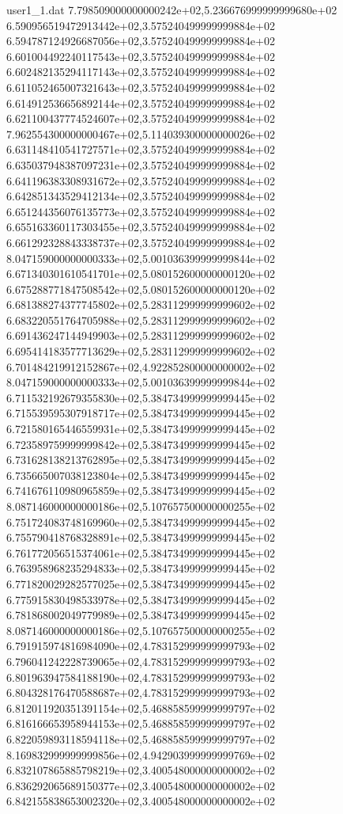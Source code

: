 \begin{filecontents}{user1_1.dat}
7.798509000000000242e+02,5.236676999999999680e+02
6.590956519472913442e+02,3.575240499999999884e+02
6.594787124926687056e+02,3.575240499999999884e+02
6.601004492240117543e+02,3.575240499999999884e+02
6.602482135294117143e+02,3.575240499999999884e+02
6.611052465007321643e+02,3.575240499999999884e+02
6.614912536656892144e+02,3.575240499999999884e+02
6.621100437774524607e+02,3.575240499999999884e+02
7.962554300000000467e+02,5.114039300000000026e+02
6.631148410541727571e+02,3.575240499999999884e+02
6.635037948387097231e+02,3.575240499999999884e+02
6.641196383308931672e+02,3.575240499999999884e+02
6.642851343529412134e+02,3.575240499999999884e+02
6.651244356076135773e+02,3.575240499999999884e+02
6.655163360117303455e+02,3.575240499999999884e+02
6.661292328843338737e+02,3.575240499999999884e+02
8.047159000000000333e+02,5.001036399999999844e+02
6.671340301610541701e+02,5.080152600000000120e+02
6.675288771847508542e+02,5.080152600000000120e+02
6.681388274377745802e+02,5.283112999999999602e+02
6.683220551764705988e+02,5.283112999999999602e+02
6.691436247144949903e+02,5.283112999999999602e+02
6.695414183577713629e+02,5.283112999999999602e+02
6.701484219912152867e+02,4.922852800000000002e+02
8.047159000000000333e+02,5.001036399999999844e+02
6.711532192679355830e+02,5.384734999999999445e+02
6.715539595307918717e+02,5.384734999999999445e+02
6.721580165446559931e+02,5.384734999999999445e+02
6.723589759999999842e+02,5.384734999999999445e+02
6.731628138213762895e+02,5.384734999999999445e+02
6.735665007038123804e+02,5.384734999999999445e+02
6.741676110980965859e+02,5.384734999999999445e+02
8.087146000000000186e+02,5.107657500000000255e+02
6.751724083748169960e+02,5.384734999999999445e+02
6.755790418768328891e+02,5.384734999999999445e+02
6.761772056515374061e+02,5.384734999999999445e+02
6.763958968235294833e+02,5.384734999999999445e+02
6.771820029282577025e+02,5.384734999999999445e+02
6.775915830498533978e+02,5.384734999999999445e+02
6.781868002049779989e+02,5.384734999999999445e+02
8.087146000000000186e+02,5.107657500000000255e+02
6.791915974816984090e+02,4.783152999999999793e+02
6.796041242228739065e+02,4.783152999999999793e+02
6.801963947584188190e+02,4.783152999999999793e+02
6.804328176470588687e+02,4.783152999999999793e+02
6.812011920351391154e+02,5.468858599999999797e+02
6.816166653958944153e+02,5.468858599999999797e+02
6.822059893118594118e+02,5.468858599999999797e+02
8.169832999999999856e+02,4.942903999999999769e+02
6.832107865885798219e+02,3.400548000000000002e+02
6.836292065689150377e+02,3.400548000000000002e+02
6.842155838653002320e+02,3.400548000000000002e+02

\end{filecontents}
